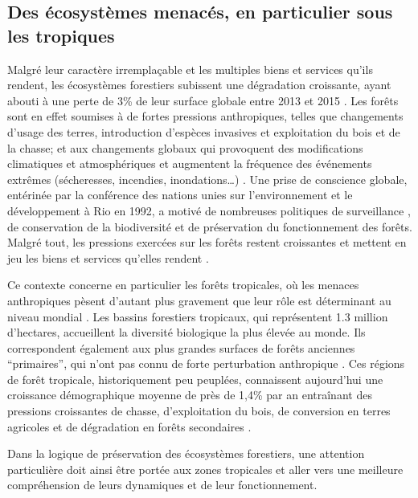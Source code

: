 \documentclass[
  11pt,
  french,
  A4paper,
  extrafontsizes,onecolumn,openright
  ]{memoir}
\begin{document}
\subsection{Des écosystèmes menacés, en particulier sous les
tropiques}\label{des-ecosystemes-menaces-en-particulier-sous-les-tropiques}

Malgré leur caractère irremplaçable et les multiples biens et services
qu'ils rendent, les écosystèmes forestiers subissent une dégradation
croissante, ayant abouti à une perte de 3\% de leur surface globale
entre 2013 et 2015 \autocite{FAO2009}. Les forêts sont en effet soumises
à de fortes pressions anthropiques, telles que changements d'usage des
terres, introduction d'espèces invasives et exploitation du bois et de
la chasse; et aux changements globaux qui provoquent des modifications
climatiques et atmosphériques et augmentent la fréquence des événements
extrêmes (sécheresses, incendies, inondations\ldots{})
\autocite{Pachauri2014}. Une prise de conscience globale, entérinée par
la conférence des nations unies sur l'environnement et le développement
à Rio en 1992, a motivé de nombreuses politiques de surveillance , de
conservation de la biodiversité et de préservation du fonctionnement des
forêts. Malgré tout, les pressions exercées sur les forêts restent
croissantes et mettent en jeu les biens et services qu'elles rendent
\autocites{Summit1992}{Schlaepfer2000}{Dirzo2003a}{Morales-Hidalgo2015}.

Ce contexte concerne en particulier les forêts tropicales, où les
menaces anthropiques pèsent d'autant plus gravement que leur rôle est
déterminant au niveau mondial \autocites{Dirzo2003a}{Hansen2013}. Les
bassins forestiers tropicaux, qui représentent 1.3 million d'hectares,
accueillent la diversité biologique la plus élevée au monde. Ils
correspondent également aux plus grandes surfaces de forêts anciennes
``primaires'', qui n'ont pas connu de forte perturbation anthropique
\autocites{Gentry1988}{FAO2011}. Ces régions de forêt tropicale,
historiquement peu peuplées, connaissent aujourd'hui une croissance
démographique moyenne de près de 1,4\% par an entraînant des pressions
croissantes de chasse, d'exploitation du bois, de conversion en terres
agricoles et de dégradation en forêts secondaires \autocite{Asner2009}.

Dans la logique de préservation des écosystèmes forestiers, une
attention particulière doit ainsi être portée aux zones tropicales et
aller vers une meilleure compréhension de leurs dynamiques et de leur
fonctionnement.
\end{document}
